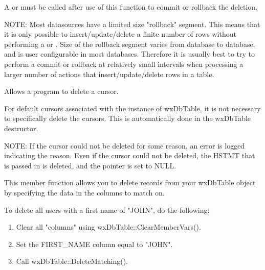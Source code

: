 A  or
 must be called after use of
this function to commit or rollback the deletion.

NOTE: Most datasources have a limited size "rollback" segment.  This means
that it is only possible to insert/update/delete a finite number of rows
without performing a  or
.  Size of the rollback
segment varies from database to database, and is user configurable in
most databases.  Therefore it is usually best to try to perform a commit
or rollback at relatively small intervals when processing a larger number
of actions that insert/update/delete rows in a table.

\label{wxdbtabledeletecursor}


Allows a program to delete a cursor.




For default cursors associated with the instance of wxDbTable, it is not
necessary to specifically delete the cursors.  This is automatically done
in the wxDbTable destructor.

NOTE: If the cursor could not be deleted for some reason, an error is logged
indicating the reason.  Even if the cursor could not be deleted, the HSTMT
that is passed in is deleted, and the pointer is set to NULL.


\label{wxdbtabledeletematching}


This member function allows you to delete records from your wxDbTable object
by specifying the data in the columns to match on.


To delete all users with a first name of "JOHN", do the following:

\begin{enumerate}\itemsep=0pt
\item Clear all "columns" using wxDbTable::ClearMemberVars().
\item Set the FIRST\_NAME column equal to "JOHN".
\item Call wxDbTable::DeleteMatching().
\end{enumerate}


